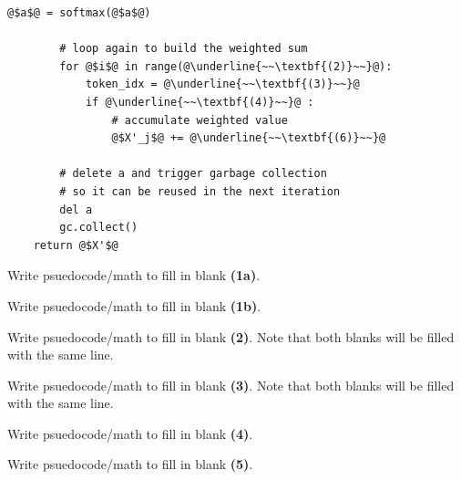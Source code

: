 \documentclass[11pt,addpoints,answers]{exam}
\begin{document}
\begin{questions}
\begin{parts}
\begin{lstlisting}[escapechar=@]
        @$a$@ = softmax(@$a$@)
        
        # loop again to build the weighted sum
        for @$i$@ in range(@\underline{~~\textbf{(2)}~~}@):
            token_idx = @\underline{~~\textbf{(3)}~~}@
            if @\underline{~~\textbf{(4)}~~}@ :
                # accumulate weighted value
                @$X'_j$@ += @\underline{~~\textbf{(6)}~~}@ 

        # delete a and trigger garbage collection 
        # so it can be reused in the next iteration
        del a
        gc.collect()
    return @$X'$@
    \end{lstlisting}
    
    \begin{subparts}

    \subpart[1] Write psuedocode/math to fill in blank \textbf{(1a)}. 

    \begin{answer_box}[title=, height = 2cm, width=15cm]
    \end{answer_box}

    \subpart[1] Write psuedocode/math to fill in blank \textbf{(1b)}. 

    \begin{answer_box}[title=, height = 2cm, width=15cm]
    \end{answer_box}


    \subpart[1] Write psuedocode/math to fill in blank \textbf{(2)}. Note that both blanks will be filled with the same line. 
    
    \begin{answer_box}[title=, height = 2cm, width=15cm]
    \end{answer_box}

    
    \subpart[1] Write psuedocode/math to fill in blank \textbf{(3)}. Note that both blanks will be filled with the same line. 
    
    \begin{answer_box}[title=, height = 2cm, width=15cm]
    \end{answer_box}

    \subpart[1] Write psuedocode/math to fill in blank \textbf{(4)}.

    \begin{answer_box}[title=, height = 2cm, width=15cm]
    \end{answer_box}

    \subpart[1] Write psuedocode/math to fill in blank \textbf{(5)}.

    \begin{answer_box}[title=, height = 2cm, width=15cm]
    \end{answer_box}


\end{subparts}
\end{parts}
\end{questions}
\end{document}
